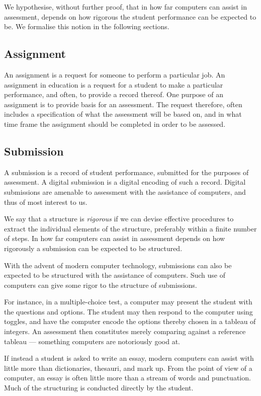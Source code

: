 We hypothesise, without further proof, that in how far computers can assist in
assessment, depends on how rigorous the student performance can be expected to
be.  We formalise this notion in the following sections.

\subsection{Assignment}

An assignment is a request for someone to perform a particular job.  An
assignment in education is a request for a student to make a particular
performance, and often, to provide a record thereof. One purpose of an
assignment is to provide basis for an assessment. The request therefore, often
includes a specification of what the assessment will be based on, and in what
time frame the assignment should be completed in order to be assessed.

\subsection{Submission}

A submission is a record of student performance, submitted for the purposes of
assessment. A digital submission is a digital encoding of such a record.
Digital submissions are amenable to assessment with the assistance of
computers, and thus of most interest to us.

We say that a structure is \emph{rigorous} if we can devise effective
procedures to extract the individual elements of the structure, preferably
within a finite number of steps. In how far computers can assist in assessment
depends on how rigorously a submission can be expected to be structured.

With the advent of modern computer technology, submissions can also be expected
to be structured with the assistance of computers. Such use of computers can
give some rigor to the structure of submissions.

For instance, in a multiple-choice test, a computer may present the student
with the questions and options. The student may then respond to the computer
using toggles, and have the computer encode the options thereby chosen in a
tableau of integers. An assessment then constitutes merely comparing against a
reference tableau --- something computers are notoriously good at.

If instead a student is asked to write an essay, modern computers can assist
with little more than dictionaries, thesauri, and mark up. From the point of
view of a computer, an essay is often little more than a stream of words and
punctuation. Much of the structuring is conducted directly by the student.

